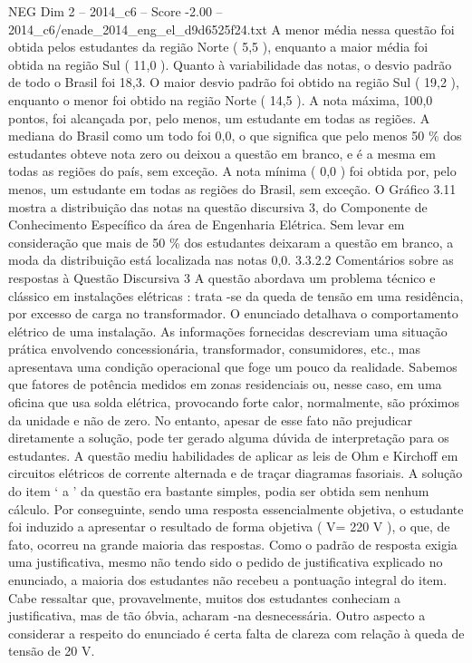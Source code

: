 \begin{textsample}{NEG Dim 2 – 2014\_c6 – Score -2.00 – 2014\_c6/enade\_2014\_eng\_el\_d9d6525f24.txt}
A menor média nessa questão foi obtida pelos estudantes da região Norte ( 5,5 ), enquanto a maior média foi obtida na região Sul ( 11,0 ).
Quanto à variabilidade das notas, o desvio padrão de todo o Brasil foi 18,3.
O maior desvio padrão foi obtido na região Sul ( 19,2 ), enquanto o menor foi obtido na região Norte ( 14,5 ).
A nota máxima, 100,0 pontos, foi alcançada por, pelo menos, um estudante em todas as regiões.
A mediana do Brasil como um todo foi 0,0, o que significa que pelo menos 50 \% dos estudantes obteve nota zero ou deixou a questão em branco, e é a mesma em todas as regiões do país, sem exceção.
A nota mínima ( 0,0 ) foi obtida por, pelo menos, um estudante em todas as regiões do Brasil, sem exceção.
O Gráfico 3.11 mostra a distribuição das notas na questão discursiva 3, do Componente de Conhecimento Específico da área de Engenharia Elétrica.
Sem levar em consideração que mais de 50 \% dos estudantes deixaram a questão em branco, a moda da distribuição está localizada nas notas 0,0. 3.3.2.2 Comentários sobre as respostas à Questão Discursiva 3 A questão abordava um problema técnico e clássico em instalações elétricas : trata -se da queda de tensão em uma residência, por excesso de carga no transformador.
O enunciado detalhava o comportamento elétrico de uma instalação.
As informações fornecidas descreviam uma situação prática envolvendo concessionária, transformador, consumidores, etc., mas apresentava uma condição operacional que foge um pouco da realidade.
Sabemos que fatores de potência medidos em zonas residenciais ou, nesse caso, em uma oficina que usa solda elétrica, provocando forte calor, normalmente, são próximos da unidade e não de zero.
No entanto, apesar de esse fato não prejudicar diretamente a solução, pode ter gerado alguma dúvida de interpretação para os estudantes.
A questão mediu habilidades de aplicar as leis de Ohm e Kirchoff em circuitos elétricos de corrente alternada e de traçar diagramas fasoriais.
A solução do item ‘ a ’ da questão era bastante simples, podia ser obtida sem nenhum cálculo.
Por conseguinte, sendo uma resposta essencialmente objetiva, o estudante foi induzido a apresentar o resultado de forma objetiva ( V= 220 V ), o que, de fato, ocorreu na grande maioria das respostas.
Como o padrão de resposta exigia uma justificativa, mesmo não tendo sido o pedido de justificativa explicado no enunciado, a maioria dos estudantes não recebeu a pontuação integral do item.
Cabe ressaltar que, provavelmente, muitos dos estudantes conheciam a justificativa, mas de tão óbvia, acharam -na desnecessária.
Outro aspecto a considerar a respeito do enunciado é certa falta de clareza com relação à queda de tensão de 20 V.

\end{textsample}

